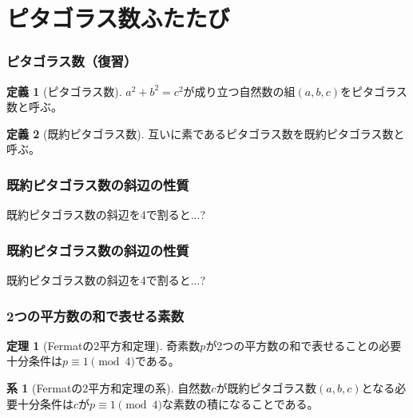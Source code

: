 \documentclass[dvipdfmx,11pt,notheorems]{beamer}
\theoremstyle{definition}
\newtheorem{theorem}{定理}
\newtheorem{definition}{定義}
\newtheorem{corollary}{系}
\begin{document}
\section{ピタゴラス数ふたたび}

\begin{frame}\frametitle{ピタゴラス数（復習）}

\begin{definition}[ピタゴラス数]
$a^{2} + b^{2} = c^{2}$が成り立つ自然数の組$(a, b, c)$をピタゴラス数と呼ぶ。
\end{definition}

\begin{definition}[既約ピタゴラス数]
互いに素であるピタゴラス数を既約ピタゴラス数と呼ぶ。
\end{definition}

\end{frame}

\begin{frame}[fragile]\frametitle{既約ピタゴラス数の斜辺の性質}

\begin{block}{既約ピタゴラス数の斜辺を4で割ると...?}
\end{block}

\end{frame}

\begin{frame}[fragile]\frametitle{既約ピタゴラス数の斜辺の性質}

\begin{block}{既約ピタゴラス数の斜辺を4で割ると...?}
\end{block}

\end{frame}


\begin{frame}\frametitle{2つの平方数の和で表せる素数}

\begin{theorem}[Fermatの2平方和定理]
奇素数$p$が2つの平方数の和で表せることの必要十分条件は$p \equiv 1 \pmod{4}$である。
\end{theorem}

\begin{corollary}[Fermatの2平方和定理の系]
自然数$c$が既約ピタゴラス数$(a,b,c)$となる必要十分条件は$c$が$p \equiv 1 \pmod{4}$な素数の積になることである。
\end{corollary}

\end{frame}
\end{document}
